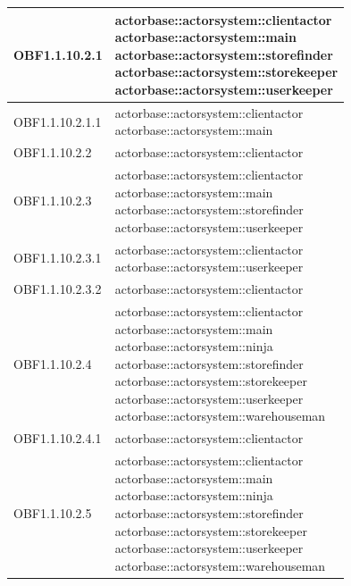 \documentclass{scalatekids-article}
\begin{document}
\begin{longtable}[H]{|p{3.5cm}|p{7.5cm}|}
\hline
OBF1.1.10.2.1 & \multiLineCell[t]{actorbase::actorsystem::clientactor\\actorbase::actorsystem::main\\actorbase::actorsystem::storefinder\\actorbase::actorsystem::storekeeper\\actorbase::actorsystem::userkeeper\\}\\
\hline
OBF1.1.10.2.1.1 & \multiLineCell[t]{actorbase::actorsystem::clientactor\\actorbase::actorsystem::main\\}\\
\hline
OBF1.1.10.2.2 & \multiLineCell[t]{actorbase::actorsystem::clientactor\\}\\
\hline
OBF1.1.10.2.3 & \multiLineCell[t]{actorbase::actorsystem::clientactor\\actorbase::actorsystem::main\\actorbase::actorsystem::storefinder\\actorbase::actorsystem::userkeeper\\}\\
\hline
OBF1.1.10.2.3.1 & \multiLineCell[t]{actorbase::actorsystem::clientactor\\actorbase::actorsystem::userkeeper\\}\\
\hline
OBF1.1.10.2.3.2 & \multiLineCell[t]{actorbase::actorsystem::clientactor\\}\\
\hline
OBF1.1.10.2.4 & \multiLineCell[t]{actorbase::actorsystem::clientactor\\actorbase::actorsystem::main\\actorbase::actorsystem::ninja\\actorbase::actorsystem::storefinder\\actorbase::actorsystem::storekeeper\\actorbase::actorsystem::userkeeper\\actorbase::actorsystem::warehouseman\\}\\
\hline
OBF1.1.10.2.4.1 & \multiLineCell[t]{actorbase::actorsystem::clientactor\\}\\
\hline
OBF1.1.10.2.5 & \multiLineCell[t]{actorbase::actorsystem::clientactor\\actorbase::actorsystem::main\\actorbase::actorsystem::ninja\\actorbase::actorsystem::storefinder\\actorbase::actorsystem::storekeeper\\actorbase::actorsystem::userkeeper\\actorbase::actorsystem::warehouseman\\}\\

\end{longtable}
\end{document}
